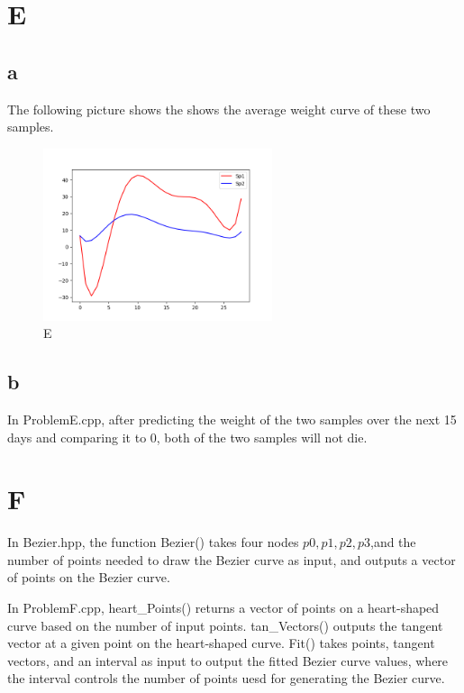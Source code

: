 \documentclass[a4paper]{article}
\begin{document}
\section{E}
\subsection*{a}
The following picture shows the shows the average weight curve of these two samples.
\begin{figure}[htbp]
  \centering
  \includegraphics[width=0.6\textwidth]{E(a).png}
  \caption{E}
  \label{E}
\end{figure}
\subsection*{b}
In ProblemE.cpp, after predicting the weight of the two samples over the next 15 days and comparing it to $0$, both of the two samples will not die.

\section{F}
In Bezier.hpp, the function Bezier() takes four nodes $p0,p1,p2,p3$,and the number of points needed to draw the Bezier curve as input, and outputs a vector of points on the Bezier curve.

In ProblemF.cpp, heart{\_}Points() returns a vector of points on a heart-shaped curve based on the number of input points. tan{\_}Vectors() outputs the tangent vector at a given point on the heart-shaped curve.
 Fit() takes points, tangent vectors, and an interval as input to output the fitted Bezier curve values, where the interval controls the number of points uesd for generating the Bezier curve.
\end{document}
